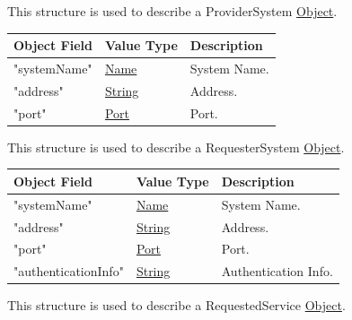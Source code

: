 \documentclass[a4paper]{arrowhead}
\newcommand{\pref}[1]{{\textcolor{ArrowheadGrey}{\hyperref[sec:model:primitives:#1]{#1}}}}
\begin{document}

This structure is used to describe a ProviderSystem \pref{Object}. 

\begin{table}[ht!]
\begin{tabularx}{\textwidth}{| p{5cm} | p{6cm} | X |} \hline
\rowcolor{gray!33} Object Field & Value Type                      & Description \\ \hline
"systemName"         & \pref{Name}     & System Name. \\ \hline
"address"            & \pref{String}   & Address. \\ \hline
"port"               & \pref{Port}     & Port. \\ \hline

\end{tabularx}
\end{table}


This structure is used to describe a RequesterSystem \pref{Object}. 

\begin{table}[ht!]
\begin{tabularx}{\textwidth}{| p{5cm} | p{6cm} | X |} \hline
\rowcolor{gray!33} Object Field & Value Type                      & Description \\ \hline
"systemName"         & \pref{Name}     & System Name. \\ \hline
"address"            & \pref{String}   & Address. \\ \hline
"port"               & \pref{Port}     & Port. \\ \hline
"authenticationInfo" & \pref{String}   & Authentication Info. \\ \hline

\end{tabularx}
\end{table}


This structure is used to describe a RequestedService \pref{Object}. 
\end{document}
